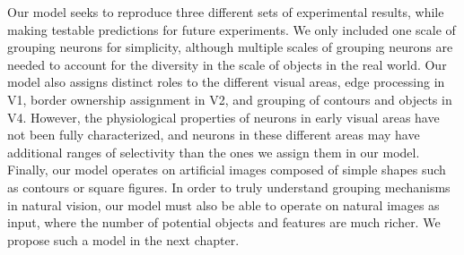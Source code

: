 Our model seeks to reproduce three different sets of experimental results, while making testable predictions for future experiments. 
We only included one scale of grouping neurons for simplicity, although 
multiple scales of grouping neurons are needed to account for the diversity in the scale of objects in the real world. Our model also assigns distinct roles to the different visual areas,  edge processing in V1, border ownership assignment in V2, and grouping of contours and objects in V4. However, the physiological properties of neurons in early visual areas have not been fully characterized, and neurons in these different areas may have additional ranges of selectivity than the ones we assign them in our model. Finally, our model operates on artificial images composed of simple shapes such as contours or square
figures. In order to truly understand grouping mechanisms in natural
vision, our model must also be able to operate on natural images as input, where the number of potential objects and features are much
richer. We propose such a model in the next chapter.


